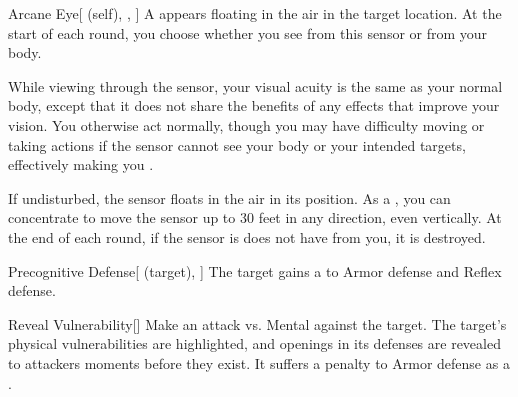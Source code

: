 \lowercase{\hypertarget{spell:Arcane Eye}{}}\label{spell:Arcane Eye}
\begin{attuneability}[Rank 1]{\hypertarget{spell:Arcane Eye}{Arcane Eye}}[ (self), , ]
A  appears floating in the air in the target location.
At the start of each round, you choose whether you see from this sensor or from your body.

While viewing through the sensor, your visual acuity is the same as your normal body, except that it does not share the benefits of any  effects that improve your vision.
You otherwise act normally, though you may have difficulty moving or taking actions if the sensor cannot see your body or your intended targets, effectively making you \blinded.

If undisturbed, the sensor floats in the air in its position.
As a , you can concentrate to move the sensor up to 30 feet in any direction, even vertically.
At the end of each round, if the sensor is does not have  from you, it is destroyed.
\end{attuneability}
\vspace{0.25em}



\lowercase{\hypertarget{spell:Precognitive Defense}{}}\label{spell:Precognitive Defense}
\begin{attuneability}[Rank 1]{\hypertarget{spell:Precognitive Defense}{Precognitive Defense}}[ (target), ]
The target gains a   to Armor defense and Reflex defense.
\end{attuneability}
\vspace{0.25em}



\lowercase{\hypertarget{spell:Reveal Vulnerability}{}}\label{spell:Reveal Vulnerability}
\begin{freeability}[Rank 1]{\hypertarget{spell:Reveal Vulnerability}{Reveal Vulnerability}}[]
Make an attack vs. Mental against the target.
\hit The target's physical vulnerabilities are highlighted, and openings in its defenses are revealed to attackers moments before they exist.
It suffers a  penalty to Armor defense as a .
\end{freeability}
\vspace{0.25em}



